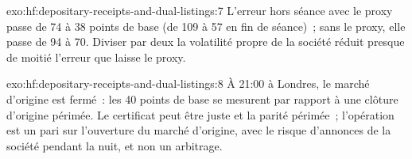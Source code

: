 \begin{solution}{exo:hf:depositary-receipts-and-dual-listings:7}
L'erreur hors séance avec le proxy passe de 74 à 38 points de base (de 109 à 57 en fin de séance)~; sans le proxy, elle passe de 94 à 70.
Diviser par deux la volatilité propre de la société réduit presque de moitié l'erreur que laisse le proxy.
\end{solution}

\begin{solution}{exo:hf:depositary-receipts-and-dual-listings:8}
À 21:00 à Londres, le marché d'origine est fermé~: les 40 points de base se mesurent par rapport à une clôture d'origine périmée. Le certificat peut être juste et la parité
périmée~; l'opération est un pari sur l'ouverture du marché d'origine, avec le risque d'annonces de la société pendant la nuit, et non un arbitrage.
\end{solution}

